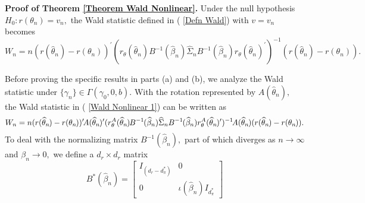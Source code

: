 \documentclass[12pt,thmsb,titlepage,final,oneside,letterpaper]{article}
\begin{document}
\noindent \textbf{Proof of Theorem \ref{Theorem Wald Nonlinear}.} Under the
null hypothesis $H_{0}:r(\theta _{n})=v_{n},$ the Wald statistic defined in (%
\ref{Defn Wald}) with $v=v_{n}$ becomes%
\begin{equation}
W_{n}=n(r(\widehat{\theta }_{n})-r(\theta _{n}))^{\prime }(r_{\theta }(%
\widehat{\theta }_{n})B^{-1}(\widehat{\beta }_{n})\widehat{\Sigma }%
_{n}B^{-1}(\widehat{\beta }_{n})r_{\theta }(\widehat{\theta }_{n})^{\prime
})^{-1}(r(\widehat{\theta }_{n})-r(\theta _{n})).  \label{Wald Nonlinear 1}
\end{equation}

Before proving the specific results in parts (a) and (b), we analyze the
Wald statistic under $\{\gamma _{n}\}\in \Gamma (\gamma _{0},0,b).$ With the
rotation represented by $A(\widehat{\theta }_{n}),$ the Wald statistic in (%
\ref{Wald Nonlinear 1}) can be written as%
\begin{equation}
W_{n}=n(r(\widehat{\theta }_{n}\hspace{-0.01in})-r(\theta _{n}\hspace{-0.01in%
}))^{\prime }\hspace{-0.02in}A(\widehat{\theta }_{n}\hspace{-0.01in}%
)^{\prime }(r_{\theta }^{A}(\widehat{\theta }_{n}\hspace{-0.01in})\hspace{%
-0.01in}B^{-1\hspace{-0.01in}}(\widehat{\beta }_{n})\widehat{\Sigma }%
_{n}B^{-1}\hspace{-0.01in}(\widehat{\beta }_{n})r_{\theta }^{A}(\widehat{%
\theta }_{n}\hspace{-0.01in})^{\prime })^{-1}\hspace{-0.02in}A(\widehat{%
\theta }_{n}\hspace{-0.01in})(r(\widehat{\theta }_{n}\hspace{-0.01in}%
)-r(\theta _{n}\hspace{-0.01in})).  \label{Wald Nonlinear 2}
\end{equation}%
To deal with the normalizing matrix $B^{-1}(\widehat{\beta }_{n}),$ part of
which diverges as $n\rightarrow \infty $ and $\beta _{n}\rightarrow 0,$ we
define a $d_{r}\times d_{r}$ matrix 
\begin{equation}
B^{\ast }(\widehat{\beta }_{n})=\left[ 
\begin{array}{cc}
I_{(d_{r}-d_{\pi }^{\ast })} & 0 \\ 
0 & \iota (\widehat{\beta }_{n})I_{d_{\pi }^{\ast }}%
\end{array}%
\right]  \label{B_star}
\end{equation}%
\end{document}
